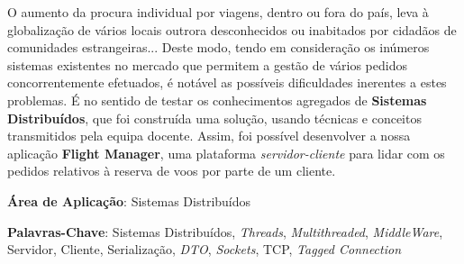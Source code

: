 \documentclass[a4paper,11pt]{scrreprt}
\begin{document}

\makecover


\renewenvironment{abstract}
{\par\noindent\textbf{\Large\abstractname}\par\bigskip}
{}

\begin{flushleft}
    \begin{abstract}
        O aumento da procura individual por viagens, dentro ou fora do país, leva à globalização 
        de vários locais outrora desconhecidos ou inabitados por cidadãos de comunidades estrangeiras...
        Deste modo, tendo em consideração os inúmeros sistemas existentes no mercado que permitem 
        a gestão de vários pedidos concorrentemente efetuados, é notável as possíveis dificuldades
        inerentes a estes problemas. 
        É no sentido de testar os conhecimentos agregados de \textbf{Sistemas Distribuídos}, que foi 
        construída uma solução, usando técnicas e conceitos transmitidos pela equipa docente.
        Assim, foi possível desenvolver a nossa aplicação \textbf{Flight Manager}, uma plataforma
        \textit{servidor-cliente} para lidar com os pedidos relativos à reserva de voos por parte de um cliente.
        \par \textbf{Área de Aplicação}: Sistemas Distribuídos
        \par \textbf{Palavras-Chave}: Sistemas Distribuídos, \textit{Threads}, \textit{Multithreaded}, 
                                      \textit{MiddleWare}, Servidor, Cliente, Serialização, \textit{DTO},
                                      \textit{Sockets}, TCP, \textit{Tagged Connection}
    \end{abstract}
\end{flushleft}

\pagebreak

\end{document}
